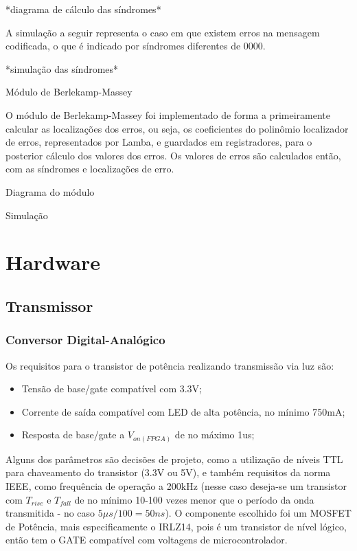 	*diagrama de cálculo das síndromes*
	
	A simulação a seguir representa o caso em que existem erros na mensagem codificada, o que é indicado por síndromes diferentes de 0000.
	
	*simulação das síndromes*
	
	Módulo de Berlekamp-Massey
	
	O módulo de Berlekamp-Massey foi implementado de forma a primeiramente calcular as localizações dos erros, ou seja, os coeficientes do polinômio localizador de erros, representados por Lamba, e guardados em registradores, para o posterior cálculo dos valores dos erros. Os valores de erros são calculados então, com as síndromes e localizações de erro.
	
	Diagrama do módulo
	
	Simulação
	
	\section{Hardware}
	\subsection{Transmissor}
	\subsubsection{Conversor Digital-Analógico}
		 Os requisitos para o transistor de potência realizando transmissão via luz são:

		\begin{itemize}
			\item Tensão de base/gate compatível com 3.3V;
			\item Corrente de saída compatível com LED de alta potência, no mínimo 750mA;
			\item Resposta de base/gate a $V_{on(FPGA)}$ de no máximo 1us;
		\end{itemize}
		
		Alguns dos parâmetros são decisões de projeto, como a utilização de níveis TTL para chaveamento do transistor (3.3V ou 5V), e também requisitos da norma IEEE, como frequência de operação a 200kHz (nesse caso deseja-se um transistor com $T_{rise}$ e $T_{fall}$ de no mínimo 10-100 vezes menor que o período da onda transmitida - no caso $5\mu$$s/100 = 50ns$).
		O componente escolhido foi um MOSFET de Potência, mais especificamente o IRLZ14, pois é um transistor de nível lógico, então tem o GATE compatível com voltagens de microcontrolador. 
		
